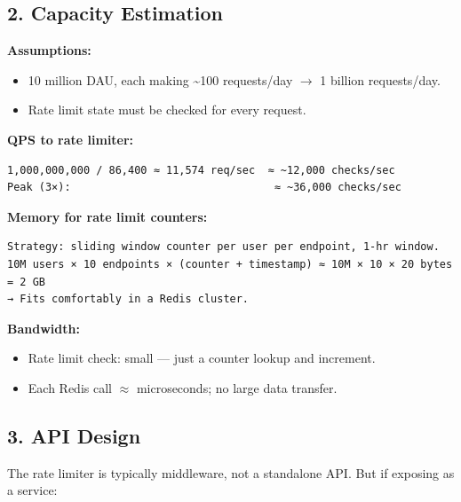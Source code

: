 \documentclass[11pt]{article}
\providecommand{\tightlist}{\setlength{\itemsep}{1pt}\setlength{\parskip}{0pt}}
\begin{document}
\subsection{2. Capacity Estimation}\label{2-capacity-estimation-1}

\textbf{Assumptions:}

\begin{itemize}
\tightlist
\item
  10 million DAU, each making \textasciitilde100 requests/day \(\rightarrow\) 1 billion requests/day.
\item
  Rate limit state must be checked for every request.
\end{itemize}

\textbf{QPS to rate limiter:}

\setcodelang{}

\begin{verbatim}
1,000,000,000 / 86,400 ≈ 11,574 req/sec  ≈ ~12,000 checks/sec
Peak (3×):                                ≈ ~36,000 checks/sec
\end{verbatim}

\textbf{Memory for rate limit counters:}

\setcodelang{}

\begin{verbatim}
Strategy: sliding window counter per user per endpoint, 1-hr window.
10M users × 10 endpoints × (counter + timestamp) ≈ 10M × 10 × 20 bytes = 2 GB
→ Fits comfortably in a Redis cluster.
\end{verbatim}

\textbf{Bandwidth:}

\begin{itemize}
\tightlist
\item
  Rate limit check: small --- just a counter lookup and increment.
\item
  Each Redis call \(\approx\) microseconds; no large data transfer.
\end{itemize}

\subsection{3. API Design}\label{3-api-design-1}

The rate limiter is typically middleware, not a standalone API. But if exposing as a service:

\end{document}
